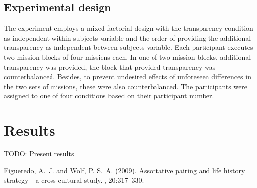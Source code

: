 \documentclass[twoside,twocolumn]{article}
\begin{document}
\subsection{Experimental design}
The experiment employs a mixed-factorial design with the transparency condition as independent within-subjects variable and the order of providing the additional transparency as independent between-subjects variable. Each participant executes two mission blocks of four missions each. In one of two mission blocks, additional transparency was provided, the block that provided transparency was counterbalanced.
Besides, to prevent undesired effects of unforeseen differences in the two sets of missions, these were also counterbalanced. The participants were assigned to one of four conditions based on their participant number.

\section{Results}
TODO: Present results



\begin{thebibliography}{99} %

Figueredo, A.~J. and Wolf, P. S.~A. (2009).
\newblock Assortative pairing and life history strategy - a cross-cultural
  study.
, 20:317--330.
 
\end{thebibliography}

\end{document}
